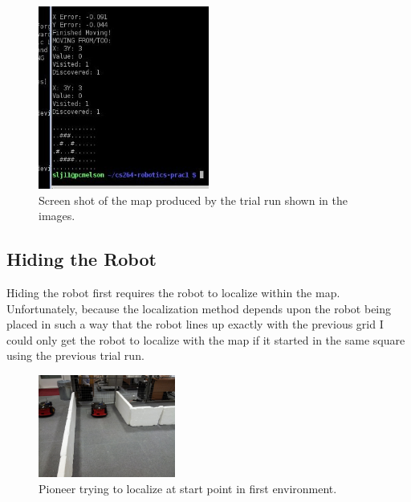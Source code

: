 \documentclass{article}
\begin{document}
\begin{figure}[H]
\centering
\includegraphics[width=0.5\textwidth]{img/robot_pics/run1_example.jpg}
\caption{Screen shot of the map produced by the trial run shown in the images.}
\label{fig:robot-map-run1}
\end{figure}

\subsection{Hiding the Robot}
Hiding the robot first requires the robot to localize within the map. Unfortunately, because the localization method depends upon the robot being placed in such a way that the robot lines up exactly with the previous grid I could only get the robot to localize with the map if it started in the same square using the previous trial run.

\begin{figure}[H]
\centering
\includegraphics[width=0.4\textwidth]{img/robot_pics/20130416_132228.jpg}
\caption{Pioneer trying to localize at start point in first environment.}
\label{fig:robot-map-localize1-image}
\end{figure}
\end{document}
